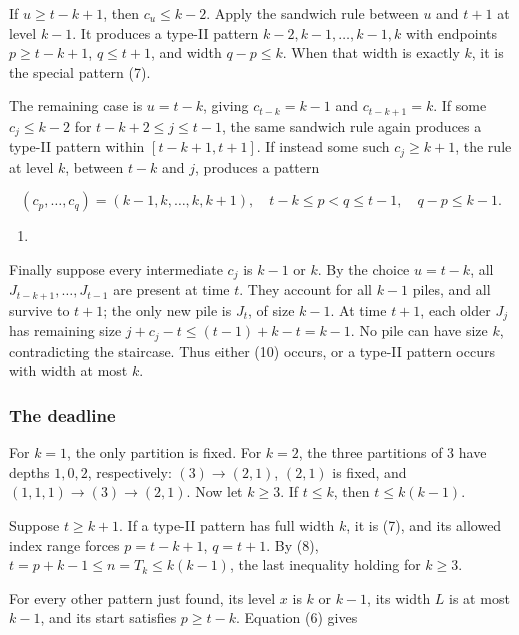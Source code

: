 \documentclass[11pt,a4paper]{article}
\providecommand{\tightlist}{\setlength{\itemsep}{0pt}\setlength{\parskip}{0pt}}
\begin{document}
If \(u\ge t-k+1\), then \(c_u\le k-2\). Apply the sandwich rule between \(u\) and \(t+1\) at level \(k-1\). It produces a type-II pattern \(k-2,k-1,\ldots,k-1,k\) with endpoints \(p\ge t-k+1\), \(q\le t+1\), and width \(q-p\le k\). When that width is exactly \(k\), it is the special pattern (7).

The remaining case is \(u=t-k\), giving \(c_{t-k}=k-1\) and \(c_{t-k+1}=k\). If some \(c_j\le k-2\) for \(t-k+2\le j\le t-1\), the same sandwich rule again produces a type-II pattern within \([t-k+1,t+1]\). If instead some such \(c_j\ge k+1\), the rule at level \(k\), between \(t-k\) and \(j\), produces a pattern

\[
(c_p,\ldots,c_q)=(k-1,k,\ldots,k,k+1),
\quad t-k\le p<q\le t-1,
\quad q-p\le k-1.
\]

\begin{enumerate}
\def\labelenumi{(\arabic{enumi})}
\setcounter{enumi}{9}
\tightlist
\item
\end{enumerate}

Finally suppose every intermediate \(c_j\) is \(k-1\) or \(k\). By the choice \(u=t-k\), all \(J_{t-k+1},\ldots,J_{t-1}\) are present at time \(t\). They account for all \(k-1\) piles, and all survive to \(t+1\); the only new pile is \(J_t\), of size \(k-1\). At time \(t+1\), each older \(J_j\) has remaining size \(j+c_j-t\le (t-1)+k-t=k-1\). No pile can have size \(k\), contradicting the staircase. Thus either (10) occurs, or a type-II pattern occurs with width at most \(k\).

\subsubsection{The deadline}\label{the-deadline}

For \(k=1\), the only partition is fixed. For \(k=2\), the three partitions of \(3\) have depths \(1,0,2\), respectively: \((3)\to(2,1)\), \((2,1)\) is fixed, and \((1,1,1)\to(3)\to(2,1)\). Now let \(k\ge3\). If \(t\le k\), then \(t\le k(k-1)\).

Suppose \(t\ge k+1\). If a type-II pattern has full width \(k\), it is (7), and its allowed index range forces \(p=t-k+1\), \(q=t+1\). By (8), \(t=p+k-1\le n=T_k\le k(k-1)\), the last inequality holding for \(k\ge3\).

For every other pattern just found, its level \(x\) is \(k\) or \(k-1\), its width \(L\) is at most \(k-1\), and its start satisfies \(p\ge t-k\). Equation (6) gives
\end{document}
